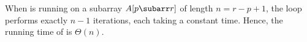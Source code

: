 When  is running on a subarray $A[p\subarr r]$ of length $n=r-p+1$, the  loop performs exactly $n-1$ iterations, each taking a constant time.
Hence, the running time of  is $\Theta(n)$.
